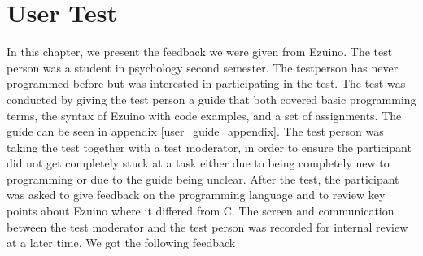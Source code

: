 \section{User Test}
In this chapter, we present the feedback we were given from Ezuino. The test person was a student in psychology second semester. The testperson has never programmed before but was interested in participating in the test. The test was conducted by giving the test person a guide that both covered basic programming terms, the syntax of Ezuino with code examples, and a set of assignments. The guide can be seen in appendix \ref{user_guide_appendix}. The test person was taking the test together with a test moderator, in order to ensure the participant did not get completely stuck at a task either due to being completely new to programming or due to the guide being unclear. After the test, the participant was asked to give feedback on the programming language and to review key points about Ezuino where it differed from C. The screen and communication between the test moderator and the test person was recorded for internal review at a later time.
We got the following feedback

